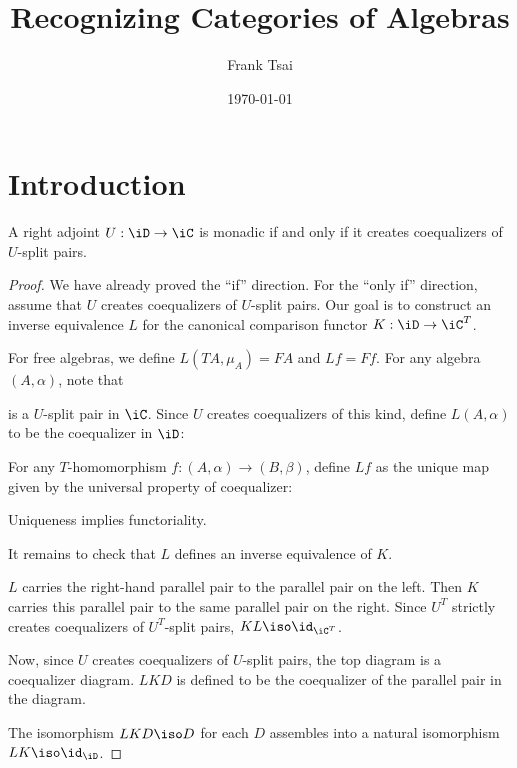 \documentclass{amsart}
\title{Recognizing Categories of Algebras}
\author{Frank Tsai}
\date{\today}
\begin{document}
\maketitle
\tableofcontents

\section{Introduction}
\label{sec:introduction}

\begin{thm}
  A right adjoint $U : \iD \to \iC$ is monadic if and only if it creates coequalizers of $U$-split pairs.
\end{thm}
\begin{proof}
  We have already proved the ``if'' direction.
  For the ``only if'' direction, assume that $U$ creates coequalizers of $U$-split pairs.
  Our goal is to construct an inverse equivalence $L$ for the canonical comparison functor $K : \iD \to \iC^{T}$.

  For free algebras, we define $L(TA,\mu_{A}) = FA$ and $Lf = Ff$.
  For any algebra $(A, \alpha)$, note that
  
  is a $U$-split pair in $\iC$.
  Since $U$ creates coequalizers of this kind, define $L(A,\alpha)$ to be the coequalizer in $\iD$:
  
  For any $T$-homomorphism $f : (A, \alpha) \to (B, \beta)$, define $Lf$ as the unique map given by the universal property of coequalizer:
  
  Uniqueness implies functoriality.

  It remains to check that $L$ defines an inverse equivalence of $K$.
  
  $L$ carries the right-hand parallel pair to the parallel pair on the left.
  Then $K$ carries this parallel pair to the same parallel pair on the right.
  Since $U^{T}$ strictly creates coequalizers of $U^{T}$-split pairs, $KL \iso \id_{\iC^{T}}$.

  Now, since $U$ creates coequalizers of $U$-split pairs, the top diagram is a coequalizer diagram.
  $LKD$ is defined to be the coequalizer of the parallel pair in the diagram.
  
  The isomorphism $LKD \iso D$ for each $D$ assembles into a natural isomorphism $LK \iso \id_{\iD}$.
\end{proof}



\end{document}
